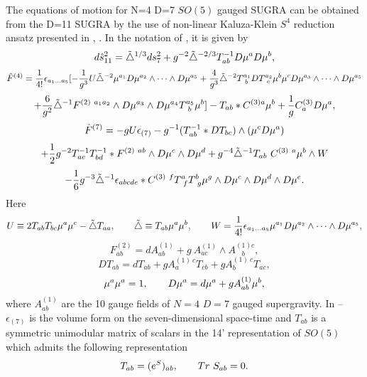 \documentclass[a4paper,11pt]{article}
\begin{document}
The equations of motion for N=4 D=7 $SO(5)$ gauged SUGRA
\cite{ppvn} can be obtained from the D=11 SUGRA by the use of
non-linear Kaluza-Klein $S^4$ reduction ansatz presented in
\cite{nieuw}, \cite{pope}. In the notation of \cite{popelec}, it
is given by
\begin{equation}\plabel{nlansds}
d{\hat s}^2_{11}=\tilde{\triangle}^{1/3}ds^2_7+g^{-2}
\tilde{\triangle}^{-2/3}T_{ab}^{-1}D{\mu}^a D{\mu}^b,
\end{equation}
\begin{equation}\plabel{nlansF4}
{\hat F}^{(4)}={1\over 4!}\e_{a_1\dots a_5} [-{1\over g^3}U\tilde{\triangle}^{-2}
\mu^{a_1}D\mu^{a_2}\wedge\dots\wedge D\mu^{a_5}
+{4\over g^3}\tilde{\triangle}^{-2}T^{a_1}_{~b}DT^{a_2}_{~c}\mu^b \mu^{c}
D\mu^{a_3}\wedge\dots \wedge D\mu^{a_5}
\end{equation}
$$
+{6\over g^2}\tilde{\triangle}^{-1} F^{(2)~a_1 a_2}\wedge D\mu^{a_3}\wedge D\mu^{a_4}
T^{a_5}_{~b}\mu^{b}]
-T_{ab}\ast C^{(3)a}\mu^b+{1\over g} C^{(3)}_a D\mu^a,
$$
\begin{equation}\plabel{nlansF7}
{\hat F}^{(7)}=-gU\epsilon_{(7)}-g^{-1}(T_{ab}^{-1}\ast DT_{bc})\wedge
(\mu^c D\mu^a)
\end{equation}
$$
+{1\over 2}g^{-2}T^{-1}_{ac}T^{-1}_{bd}\ast F^{(2)~ab}\wedge
D\mu^c\wedge D\mu^d+g^{-4}\tilde{\triangle}^{-1}T_{ab}~C^{(3)~a}
\mu^b \wedge W
$$
$$
-{1\over 6}g^{-3}\tilde{\triangle}^{-1}\epsilon_{abcde}\ast C^{(3)~f} T^a_{~f}
T^b_{~g}\mu^g\wedge D{\mu}^c \wedge D{\mu}^d \wedge D{\mu}^e.
$$
Here
$$
U\equiv 2T_{ab}T_{bc}\mu^a\mu^c-\tilde{\triangle}T_{aa},\qquad
\tilde{\triangle}\equiv T_{ab}\mu^a\mu^b, \qquad
W={1\over 4!}\epsilon_{a_1\dots a_5}\mu^{a_1} D{\mu}^{a_2}\wedge \dots \wedge
D{\mu}^{a_5},
$$
$$
F^{(2)}_{ab}=dA^{(1)}_{ab}+g~A^{(1)}_{ac}\wedge A^{(1)c}_{~~~~b},
$$
$$
DT_{ab}=dT_{ab}+gA^{(1)~c}_{a}T_{cb}+gA^{(1)~c}_{b}T_{ac},
$$
\begin{equation}\plabel{defs}
\mu^a\mu^a=1,\qquad D\mu^a=d\mu^a+g A^{(1)}_{ab}\mu^b,
\end{equation}
where $A^{(1)}_{ab}$ are the 10 gauge fields of $N=4$ $D=7$ gauged
supergravity. In  --  $\epsilon_{(7)}$ is the
volume form on the seven-dimensional space-time and $T_{ab}$ is
a symmetric unimodular matrix of scalars in the 14'
representation of $SO(5)$ which admits the following
representation
\begin{equation}\plabel{Treps}
T_{ab}=(e^{S})_{ab},\qquad Tr~ S_{ab}=0.
\end{equation}
\end{document}
